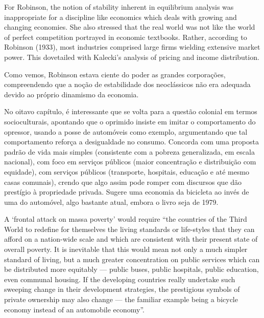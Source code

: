 	\begin{citacao}
		For Robinson, the notion of stability inherent in equilibrium analysis was inappropriate for a discipline like economics which deals with growing and changing economies. She also stressed that the real world was not like the world of perfect competition portrayed in economic textbooks. Rather, according to Robinson (1933), most industries comprised large firms wielding extensive market power. This	dovetailed with Kalecki’s analysis of pricing and income distribution.
		\cite[pág. 3]{Holt2001}
	\end{citacao}
	
	Como vemos, Robinson estava ciente do poder as grandes corporações, compreendendo que a noção de estabilidade dos neoclássicos não era adequada devido ao próprio dinamismo da economia.
	
	No oitavo capítulo, é interessante que  se volta para a questão colonial em termos socioculturais, apontando que o oprimido insiste em imitar o comportamento do opressor, usando a posse de automóveis como exemplo, argumentando que tal comportamento reforça a desigualdade no consumo. Concorda com uma proposta padrão de vida mais simples (consistente com a pobreza generalizada, em escala nacional), com foco em serviços públicos (maior concentração e distribuição com equidade), com serviços públicos (transporte, hospitais, educação e até mesmo casas comunais), crendo que algo assim pode romper com discursos que dão prestígio à propriedade privada. Sugere uma economia da bicicleta ao invés de uma do automóvel, algo bastante atual, embora o livro seja de 1979.
	
	\begin{citacao}
		A `frontal attack on massa poverty' would require ``the countries of the Third World to redefine for themselves the living standards or life-styles that they can afford on a nation-wide scale and which are consistent with their present state of overall poverty. It is inevitable that this would mean not only a much simpler standard of living, but a much greater concentration on public services which can be distributed more equitably — public buses, public hospitals, public education, even communal housing. If the developing countries really undertake such sweeping change in their development strategies, the prestigious symbols of private ownership may also change — the familiar example being a bicycle economy instead of an automobile economy''.
	\end{citacao}
	
